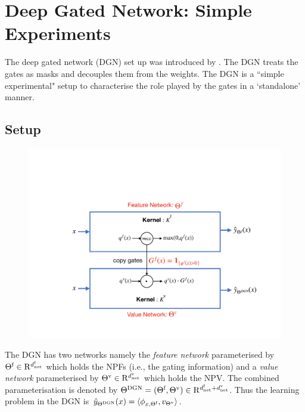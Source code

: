 \section{Deep Gated Network: Simple Experiments }
The deep gated network (DGN) set up was introduced by \cite{npk}. The DGN treats the gates as masks and decouples them from the weights. The DGN is a ``simple experimental" setup to characterise the role played by the gates in a `standalone' manner.  
\subsection{Setup}
\FloatBarrier
\begin{figure}[H]
\begin{center}
\includegraphics[scale=0.3]{figs/dgn.pdf}
\end{center}
\end{figure}
The DGN has two networks namely the \emph{feature network} parameterised by $\Theta^{\textrm{f}}\in\mathrm{R}^{d^{\text{f}}_{\text{net}}}$ which holds the NPFs (i.e., the gating information) and a \emph{value network} parameterised by ${\Theta}^{\text{v}}\in\mathrm{R}^{d^{\text{v}}_{\text{net}}}$ which holds the NPV.  The combined parameterisation is denoted by $\Theta^{\text{DGN}}=(\Theta^{\textrm{f}},{\Theta}^{\text{v}})\in \mathrm{R}^{d^{\text{f}}_{\text{net}}+d^{\text{v}}_{\text{net}}}$.  Thus the learning problem in the DGN is $\hat{y}_{\Theta^{\text{DGN}}}(x)=\langle \phi_{x,\Theta^{\textrm{f}}},v_{{\Theta}^{\text{v}}}\rangle$. 

